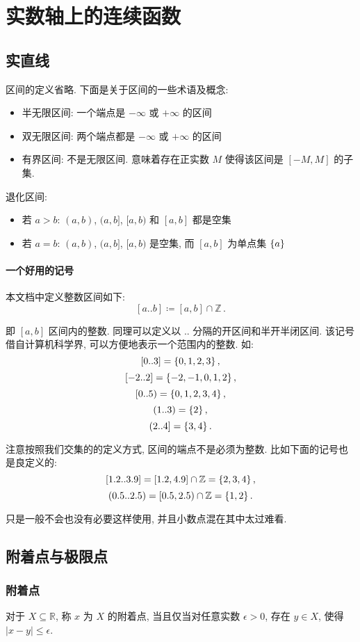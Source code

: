 \documentclass[UTF8]{ctexart}
\theoremstyle{mystyle}
\theoremstyle{myremark}
\theoremstyle{plain}
\newcommand{\R}{\mathbb R}
\newcommand{\Z}{\mathbb Z}
\DeclarePairedDelimiter\set{\{}{\}}
\begin{document}
\tableofcontents
\section{实数轴上的连续函数}
\subsection{实直线}
区间的定义省略. 下面是关于区间的一些术语及概念:
\begin{itemize}
    \item 半无限区间: 一个端点是 $ -\infty $ 或 $ +\infty $ 的区间
    \item 双无限区间: 两个端点都是 $ -\infty $ 或 $ +\infty $ 的区间
    \item 有界区间: 不是无限区间. 意味着存在正实数 $ M $ 使得该区间是 $ [-M, M] $ 的子集.
\end{itemize}

退化区间:
\begin{itemize}
    \item 若 $ a > b $: $ (a, b) $, $ (a, b] $, $ [a, b) $ 和 $ [a, b] $ 都是空集
    \item 若 $ a = b $: $ (a, b) $, $ (a, b] $, $ [a, b) $ 是空集, 而 $ [a, b] $ 为单点集 $ \set{a} $
\end{itemize}

\paragraph{一个好用的记号}
本文档中定义整数区间如下:
\[ [a .. b] \coloneqq [a, b] \cap \Z \,.\]

即 $ [a, b] $ 区间内的整数. 同理可以定义以 $ .. $ 分隔的开区间和半开半闭区间. 该记号借自计算机科学界, 可以方便地表示一个范围内的整数. 如:
\[ [0 .. 3] = \set{0, 1, 2, 3} \,,\]
\[ [-2 .. 2] = \set{-2, -1, 0, 1, 2} \,,\]
\[ [0 .. 5) = \set{0, 1, 2, 3, 4} \,,\]
\[ (1 .. 3) = \set{2} \,,\]
\[ (2 .. 4] = \set{3, 4} \,.\]

注意按照我们交集的的定义方式, 区间的端点不是必须为整数. 比如下面的记号也是良定义的:
\[ [1.2 .. 3.9] = [1.2, 4.9] \cap \Z = \set{2, 3, 4} \,,\]
\[ (0.5 .. 2.5) = [0.5, 2.5) \cap \Z = \set{1, 2} \,.\]

只是一般不会也没有必要这样使用, 并且小数点混在其中太过难看.


\subsection{附着点与极限点}
\subsubsection{附着点}
\begin{definition}
    对于 $ X \subseteq \R $, 称 $ x $ 为 $ X $ 的附着点, 当且仅当对任意实数 $ \epsilon > 0 $, 存在 $ y \in X $, 使得 $ |x - y| \leqslant \epsilon $.
\end{definition}
\end{document}
